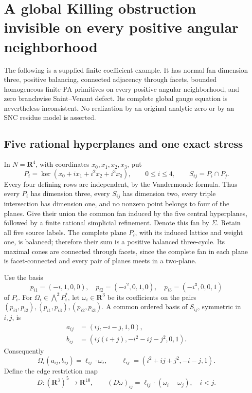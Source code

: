 \section{A global Killing obstruction invisible on every positive angular neighborhood}
\label{sec:r13-punctured-three-fan-obstruction}

The following is a supplied finite coefficient example.  It has normal
fan dimension three, positive balancing, connected adjacency through
facets, bounded homogeneous finite-PA primitives on every positive
angular neighborhood, and zero branchwise Saint--Venant defect.  Its
complete global gauge equation is nevertheless inconsistent.  No
realization by an original analytic zero or by an SNC residue model
is asserted.

\subsection{Five rational hyperplanes and one exact stress}

In \(N=\mathbf R^4\), with coordinates \(x_0,x_1,x_2,x_3\), put
\[
 P_i=\ker(x_0+i x_1+i^2x_2+i^3x_3),\qquad 0\leq i\leq4,
 \qquad S_{ij}=P_i\cap P_j.
 \tag{PK1}
\]
Every four defining rows are independent, by the Vandermonde
formula.  Thus every \(P_i\) has dimension three, every
\(S_{ij}\) has dimension two, every triple intersection has
dimension one, and no nonzero point belongs to four of the planes.
Give their union the common fan induced by the five central
hyperplanes, followed by a finite rational simplicial refinement.
Denote this fan by \(\Sigma\).  Retain all five source labels.
The complete plane \(P_i\), with its induced lattice and weight
one, is balanced; therefore their sum is a positive balanced
three-cycle.  Its maximal cones are connected through facets,
since the complete fan in each plane is facet-connected and
every pair of planes meets in a two-plane.

Use the basis
\[
 p_{i1}=(-i,1,0,0),\quad
 p_{i2}=(-i^2,0,1,0),\quad
 p_{i3}=(-i^3,0,0,1)
 \tag{PK2}
\]
of \(P_i\).  For \(\Omega_i\in\bigwedge^2 P_i^*\), let
\(\omega_i\in\mathbf R^3\) be its coefficients on the pairs
\((p_{i1},p_{i2}),(p_{i1},p_{i3}),(p_{i2},p_{i3})\).
A common ordered basis of \(S_{ij}\), symmetric in \(i,j\), is
\[
 \begin{split}
 a_{ij}&=(ij,-i-j,1,0),\\
 b_{ij}&=(ij(i+j),-i^2-ij-j^2,0,1).
 \end{split}
 \tag{PK3}
\]
Consequently
\[
 \Omega_i(a_{ij},b_{ij})
       =\ell_{ij}\cdot\omega_i,
 \qquad
 \ell_{ij}=(i^2+ij+j^2,-i-j,1).
 \tag{PK4}
\]
Define the edge restriction map
\[
 D:(\mathbf R^3)^5\longrightarrow\mathbf R^{10},
 \qquad(D\omega)_{ij}
       =\ell_{ij}\cdot(\omega_i-\omega_j),\quad i<j.
 \tag{PK5}
\]

